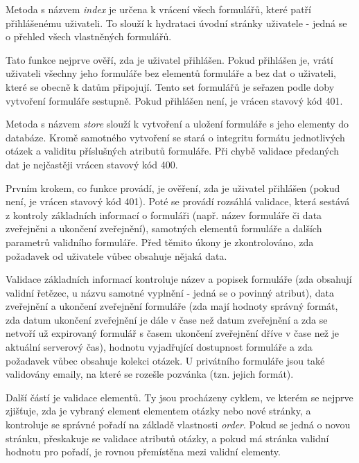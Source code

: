 			Metoda s názvem \textit{index} je určena k vrácení všech formulářů, které patří přihlášenému uživateli. To slouží k hydrataci úvodní stránky uživatele - jedná se o přehled všech vlastněných formulářů. 
			
			Tato funkce nejprve ověří, zda je uživatel přihlášen. Pokud přihlášen je, vrátí uživateli všechny jeho formuláře bez elementů formuláře a bez dat o uživateli, které se obecně k datům připojují. Tento set formulářů je seřazen podle doby vytvoření formuláře sestupně. Pokud přihlášen není, je vrácen stavový kód 401. 
			
			Metoda s názvem \textit{store} slouží k vytvoření a uložení formuláře s jeho elementy do databáze. Kromě samotného vytvoření se stará o integritu formátu jednotlivých otázek a validitu příslušných atributů formuláře. Při chybě validace předaných dat je nejčastěji vrácen stavový kód 400.
			
			Prvním krokem, co funkce provádí, je ověření, zda je uživatel přihlášen (pokud není, je vrácen stavový kód 401). Poté se provádí rozsáhlá validace, která sestává z kontroly základních informací o formuláři (např. název formuláře či data zveřejněni a ukončení zveřejnění), samotných elementů formuláře a dalších parametrů validního formuláře. Před těmito úkony je zkontrolováno, zda požadavek od uživatele vůbec obsahuje nějaká data.
			
			Validace základních informací kontroluje název a popisek formuláře (zda obsahují validní řetězec, u názvu samotné vyplnění - jedná se o povinný atribut), data zveřejnění a ukončení zveřejnění formuláře (zda mají hodnoty správný formát, zda datum ukončení zveřejnění je dále v čase než datum zveřejnění a zda se netvoří už expirovaný formulář s časem ukončení zveřejnění dříve v čase než je aktuální serverový čas), hodnotu vyjadřující dostupnost formuláře a zda požadavek vůbec obsahuje kolekci otázek. U privátního formuláře jsou také validovány emaily, na které se rozešle pozvánka (tzn. jejich formát).
			
			Další částí je validace elementů. Ty jsou procházeny cyklem, ve kterém se nejprve zjišťuje, zda je vybraný element elementem otázky nebo nové stránky, a kontroluje se správné pořadí na základě vlastnosti \textit{order}. Pokud se jedná o novou stránku, přeskakuje se validace atributů otázky, a pokud má stránka validní hodnotu pro pořadí, je rovnou přemístěna mezi validní elementy. 
			
